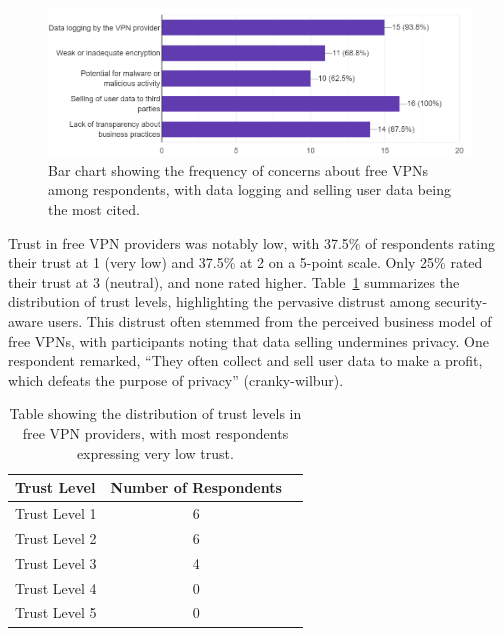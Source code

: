 \documentclass[11pt,a4paper]{article}
\begin{document}
\begin{figure}[h]
    \centering
    \includegraphics[width=1.0\textwidth]{fig 1.png} 
    \caption{Bar chart showing the frequency of concerns about free VPNs among respondents, with data logging and selling user data being the most cited.}
    \label{Fig 1: Top Concerns About Free VPNs}
\end{figure}


Trust in free VPN providers was notably low, with 37.5\% of respondents rating their trust at 1 (very low) and 37.5\% at 2 on a 5-point scale. Only 25\% rated their trust at 3 (neutral), and none rated higher. Table~\ref{Table 1: Trust in Free VPN Providers} summarizes the distribution of trust levels, highlighting the pervasive distrust among security-aware users. This distrust often stemmed from the perceived business model of free VPNs, with participants noting that data selling undermines privacy. One respondent remarked, ``They often collect and sell user data to make a profit, which defeats the purpose of privacy'' (cranky-wilbur).

\begin{table}[h] 
    \centering
    \renewcommand{\arraystretch}{1.5}
    \setlength{\tabcolsep}{12pt}
    \begin{tabular}{|l|c|r|}
        \hline
        Trust Level & Number of Respondents \\
        \hline 
        Trust Level 1   &  6   \\
        Trust Level 2   &  6   \\ 
        Trust Level 3   &  4   \\ 
        Trust Level 4   &  0   \\ 
        Trust Level 5   &  0   \\ 
        \hline
    \end{tabular}
    \caption{Table showing the distribution of trust levels in free VPN providers, with most respondents expressing very low trust.}
    \label{Table 1: Trust in Free VPN Providers}
\end{table}
\end{document}
